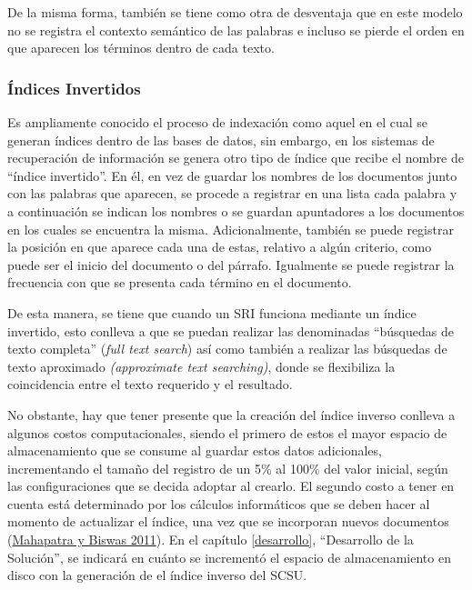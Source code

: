 \documentclass[
  12pt,
  openany]{book}
\begin{document}
De la misma forma, también se tiene como otra de desventaja que en este modelo no se registra el contexto semántico de las palabras e incluso se pierde el orden en que aparecen los términos dentro de cada texto.

\hypertarget{invind}{%
\subsubsection{Índices Invertidos}\label{invind}}

Es ampliamente conocido el proceso de indexación como aquel en el cual se generan índices dentro de las bases de datos, sin embargo, en los sistemas de recuperación de información se genera otro tipo de índice que recibe el nombre de ``índice invertido''. En él, en vez de guardar los nombres de los documentos junto con las palabras que aparecen, se procede a registrar en una lista cada palabra y a continuación se indican los nombres o se guardan apuntadores a los documentos en los cuales se encuentra la misma. Adicionalmente, también se puede registrar la posición en que aparece cada una de estas, relativo a algún criterio, como puede ser el inicio del documento o del párrafo. Igualmente se puede registrar la frecuencia con que se presenta cada término en el documento.

De esta manera, se tiene que cuando un SRI funciona mediante un índice invertido, esto conlleva a que se puedan realizar las denominadas ``búsquedas de texto completa'' (\emph{full text search}) así como también a realizar las búsquedas de texto aproximado \emph{(approximate text searching)}, donde se flexibiliza la coincidencia entre el texto requerido y el resultado.

No obstante, hay que tener presente que la creación del índice inverso conlleva a algunos costos computacionales, siendo el primero de estos el mayor espacio de almacenamiento que se consume al guardar estos datos adicionales, incrementando el tamaño del registro de un 5\% al 100\% del valor inicial, según las configuraciones que se decida adoptar al crearlo. El segundo costo a tener en cuenta está determinado por los cálculos informáticos que se deben hacer al momento de actualizar el índice, una vez que se incorporan nuevos documentos (\protect\hyperlink{ref-Mahapatra2011}{Mahapatra y Biswas 2011}). En el capítulo \ref{desarrollo}, ``Desarrollo de la Solución'', se indicará en cuánto se incrementó el espacio de almacenamiento en disco con la generación de el índice inverso del SCSU.
\end{document}
